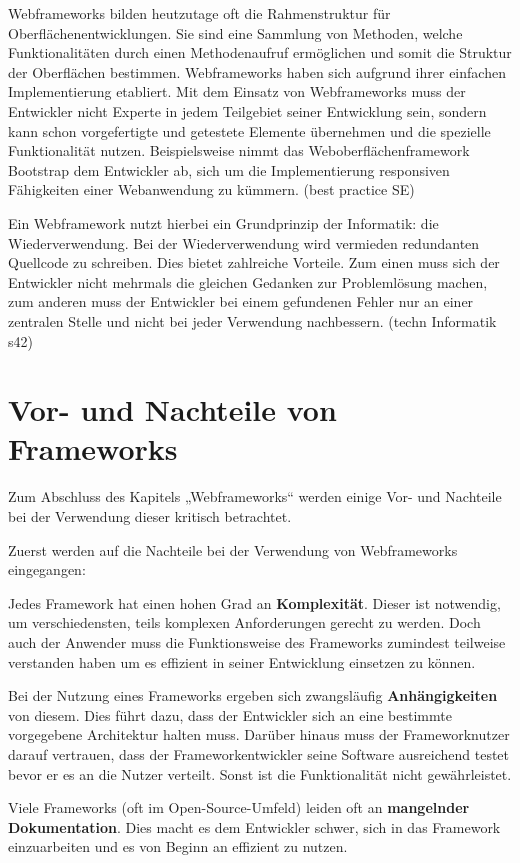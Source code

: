 Webframeworks bilden heutzutage oft die Rahmenstruktur für Oberflächenentwicklungen. Sie sind eine Sammlung von Methoden, welche Funktionalitäten durch einen Methodenaufruf ermöglichen und somit die Struktur der Oberflächen bestimmen. Webframeworks haben sich aufgrund ihrer einfachen Implementierung etabliert. Mit dem Einsatz von Webframeworks muss der Entwickler nicht Experte in jedem Teilgebiet seiner Entwicklung sein, sondern kann schon vorgefertigte und getestete Elemente übernehmen und die spezielle Funktionalität nutzen. Beispielsweise nimmt das Weboberflächenframework Bootstrap dem Entwickler ab, sich um die Implementierung responsiven Fähigkeiten einer Webanwendung zu kümmern. (best practice SE)

Ein Webframework nutzt hierbei ein Grundprinzip der Informatik: die Wiederverwendung. Bei der Wiederverwendung wird vermieden redundanten Quellcode zu schreiben. Dies bietet zahlreiche Vorteile. Zum einen muss sich der Entwickler nicht mehrmals die gleichen Gedanken zur Problemlösung machen, zum anderen muss der Entwickler bei einem gefundenen Fehler nur an einer zentralen Stelle und nicht bei jeder Verwendung nachbessern. (techn Informatik s42)


\section{Vor- und Nachteile von Frameworks}

Zum Abschluss des Kapitels „Webframeworks“ werden einige Vor- und Nachteile bei der Verwendung dieser kritisch betrachtet. 

Zuerst werden auf die Nachteile bei der Verwendung von Webframeworks eingegangen:

Jedes Framework hat einen hohen Grad an \textbf{Komplexität}. Dieser ist notwendig, um verschiedensten, teils komplexen Anforderungen gerecht zu werden. Doch auch der Anwender muss die Funktionsweise des Frameworks zumindest teilweise verstanden haben um es effizient in seiner Entwicklung einsetzen zu können.

Bei der Nutzung eines Frameworks ergeben sich zwangsläufig \textbf{Anhängigkeiten} von diesem. Dies führt dazu, dass der Entwickler sich an eine bestimmte vorgegebene Architektur halten muss. Darüber hinaus muss der Frameworknutzer darauf vertrauen, dass der Frameworkentwickler seine Software ausreichend testet bevor er es an die Nutzer verteilt. Sonst ist die Funktionalität nicht gewährleistet.

Viele Frameworks (oft im Open-Source-Umfeld) leiden oft an \textbf{mangelnder Dokumentation}. Dies macht es dem Entwickler schwer, sich in das Framework einzuarbeiten und es von Beginn an effizient zu nutzen.

